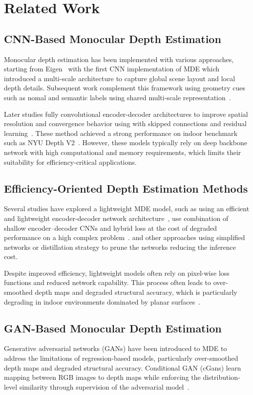 \documentclass[journal,article,submit,pdftex,moreauthors]{Definitions/mdpi}
\begin{document}
\section{Related Work}

\subsection{CNN-Based Monocular Depth Estimation}
Monocular depth estimation has been implemented with various approaches, starting from Eigen~\cite{eigen14062283} with the first CNN implementation of MDE 
which introduced a multi-scale architecture to capture global scene layout and local depth details. 
Subsequent work complement this framework using geometry cues such as nomal and semantic labels using shared multi-scale representation~\cite{lee2021bigsmallmultiscalelocal}.

Later studies fully convolutional encoder-decoder architectures to improve spatial resolution and convergence behavior using with skipped connections and residual learning~\cite{zhang2019patternaffinitivepropagationdepthsurface}.
These method achieved a strong performance on indoor benchmark such as NYU Depth V2~\cite{zhou2017unsupervisedlearningdepthegomotion}. 
However, these models typically rely on deep backbone network with high computational and memory requirements, which limits their suitability for efficiency-critical applications.

\subsection{Efficiency-Oriented Depth Estimation Methods}
Several studies have explored a lightweight MDE model, such as using an efficient and lightweight encoder-decoder network architecture~\cite{Wofk2019FastDepth},
use combination of shallow encoder–decoder CNNs and hybrid loss at the cost of degraded performance on a high complex problem~\cite{dong2021mobilexnetefficientconvolutionalneural}.
and other approaches using simplified networks or distillation strategy to prune the networks reducing the inference cost.

Despite improved efficiency, lightweight models often rely on pixel-wise loss functions and reduced network capability. 
This process often leads to over-smoothed depth maps and degraded structural accuracy, which is particularly degrading in indoor environments dominated by planar surfaces~\cite{khan20082272,masomians22145353}.

\subsection{GAN-Based Monocular Depth Estimation}
Generative adversarial networks (GANs) have been introduced to MDE to address the limitations of regression-based models, particularly over-smoothed depth maps and degraded structural accuracy.
Conditional GAN (cGans) learn mapping between RGB images to depth maps while enforcing the distribution-level similarity through supervision of the adversarial model~\cite{Hao2023GAN}.
\end{document}
